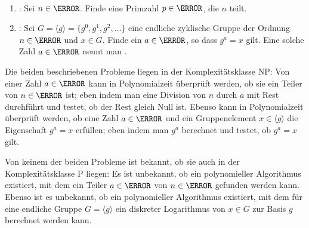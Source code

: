   
%    

\begin{construction}{\ }
\begin{enumerate}
 \item {}: Sei $n \in \N$. Finde eine Primzahl $p \in \N$, die $n$ teilt.
 \item {}: Sei $G = \langle g \rangle = \{g^0, g^1, g^2, \dotsc\}$ eine endliche zyklische Gruppe der Ordnung $n \in \N$ und $x \in G$. Finde ein $a \in \N$, so dass $g^a = x$ gilt. Eine solche Zahl $a \in \N$ nennt man .
\end{enumerate}
\end{construction}

 Die beiden beschriebenen Probleme liegen in der Komplexitätsklasse NP: Von einer Zahl $a \in \N$ kann in Polynomialzeit überprüft werden, ob sie ein Teiler von $n \in \N$ ist; eben indem man eine Division von $n$ durch $a$ mit Rest durchführt und testet, ob der Rest gleich Null ist. Ebenso kann in Polynomialzeit überprüft werden, ob eine Zahl $a \in \N$ und ein Gruppenelement $x \in \langle g \rangle$ die Eigenschaft $g^a = x$ erfüllen; eben indem man $g^a$ berechnet und testet, ob $g^a = x$ gilt. 
 
 Von keinem der beiden Probleme ist bekannt, ob sie auch in der Komplexitätsklasse P liegen: Es ist unbekannt, ob ein polynomieller Algorithmus existiert, mit dem ein Teiler $a \in \N$ von $n \in \N$ gefunden werden kann. Ebenso ist es unbekannt, ob ein polynomieller Algorithmus existiert, mit dem für eine endliche Gruppe $G = \langle g \rangle$ ein diskreter Logarithmus von $x \in G$ zur Basis $g$ berechnet werden kann. 
 
